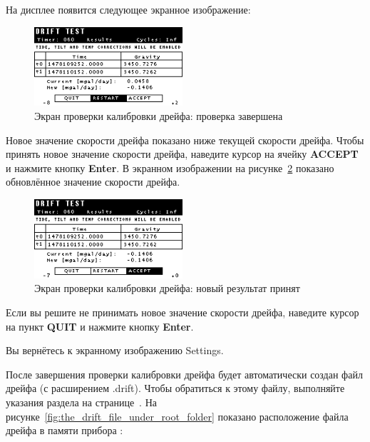 На дисплее появится следующее экранное изображение:

\begin{figure}[H]
  \centering
  \includegraphics[width=0.49\textwidth]{figures/the_drift_calibration_test_screen_test_completed}
  \caption{Экран проверки калибровки дрейфа: проверка завершена}
  \label{fig:the_drift_calibration_test_screen_test_completed}
\end{figure}

Новое значение скорости дрейфа показано ниже текущей скорости дрейфа. Чтобы
принять новое значение скорости дрейфа, наведите курсор на ячейку
\textbf{ACCEPT} и нажмите кнопку \textbf{Enter}. В экранном изображении на
рисунке~\ref{fig:the_drift_calibration_test_screen_accepting_new_result}
показано обновлённое значение скорости дрейфа.

\begin{figure}[H]
  \centering
  \includegraphics[width=0.49\textwidth]{figures/the_drift_calibration_test_screen_accepting_new_result}
  \caption{Экран проверки калибровки дрейфа: новый результат принят}
  \label{fig:the_drift_calibration_test_screen_accepting_new_result}
\end{figure}

Если вы решите не принимать новое значение скорости дрейфа, наведите курсор на
пункт \textbf{QUIT} и нажмите кнопку \textbf{Enter}.

Вы вернётесь к экранному изображению Settings.

После завершения проверки калибровки дрейфа будет автоматически создан файл
дрейфа (с расширением .drift). Чтобы обратиться к этому файлу, выполняйте
указания раздела  на
странице~\pageref{subsec:taking_a_measurement}. На
рисунке~\ref{fig:the_drift_file_under_root_folder} показано расположение файла
дрейфа в памяти прибора \cg{}:

